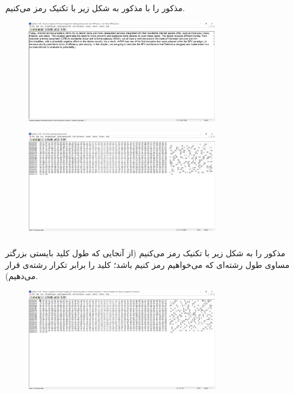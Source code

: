 \documentclass{article}
\begin{document}
\subsection{}%

\subsubsection{}
 مذکور را با  مذکور به شکل زیر با تکنیک  رمز می‌کنیم.
\begin{figure}[H]
    \centering
    \includegraphics[width=0.75\textwidth]{figures/5aa.jpg}
    \caption
	{}
    \label{fig:fig1}
\end{figure}
\begin{figure}[H]
    \centering
    \includegraphics[width=0.75\textwidth]{figures/5ab.jpg}
    \caption
	{}
    \label{fig:fig1}
\end{figure}

\subsubsection{}
 مذکور را به شکل زیر با تکنیک  رمز می‌کنیم (از آنجایی که طول کلید  بایستی بزرگتر مساوی طول رشته‌ای که می‌خواهیم رمز کنیم باشد؛ کلید  را برابر تکرار رشته‌ی  قرار می‌دهیم).
\begin{figure}[H]
    \centering
    \includegraphics[width=0.75\textwidth]{figures/5ba.jpg}
    \caption
	{}
    \label{fig:fig1}
\end{figure}
\end{document}
